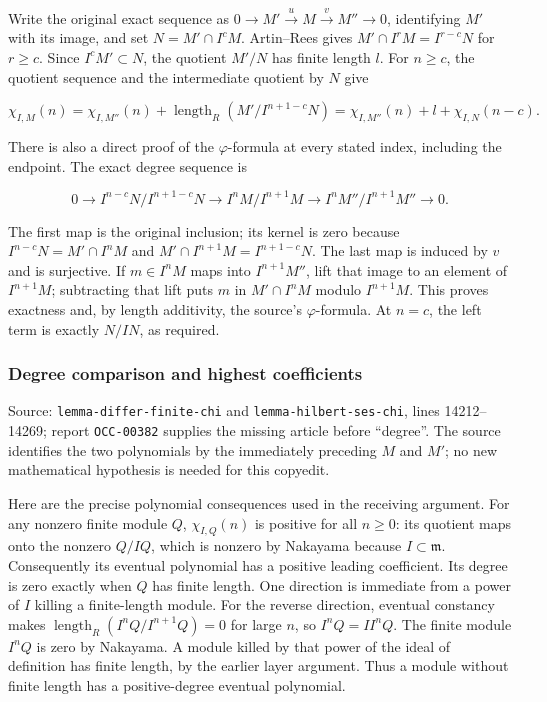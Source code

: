 Write the original exact sequence as \(0\to M'\xrightarrow{u}M\xrightarrow{v}M''\to0\), identifying \(M'\) with its image, and set \(N=M'\cap I^cM\). Artin--Rees gives \(M'\cap I^rM=I^{r-c}N\) for \(r\geq c\). Since \(I^cM'\subset N\), the quotient \(M'/N\) has finite length \(l\). For \(n\geq c\), the quotient sequence and the intermediate quotient by \(N\) give

\[
\chi_{I,M}(n)=\chi_{I,M''}(n)
 +\operatorname{length}_R(M'/I^{n+1-c}N)
=\chi_{I,M''}(n)+l+\chi_{I,N}(n-c).
\]

There is also a direct proof of the \(\varphi\)-formula at every stated index, including the endpoint. The exact degree sequence is

\[
0\longrightarrow I^{n-c}N/I^{n+1-c}N
\longrightarrow I^nM/I^{n+1}M
\longrightarrow I^nM''/I^{n+1}M''\longrightarrow0.
\]

The first map is the original inclusion; its kernel is zero because \(I^{n-c}N=M'\cap I^nM\) and \(M'\cap I^{n+1}M=I^{n+1-c}N\). The last map is induced by \(v\) and is surjective. If \(m\in I^nM\) maps into \(I^{n+1}M''\), lift that image to an element of \(I^{n+1}M\); subtracting that lift puts \(m\) in \(M'\cap I^nM\) modulo \(I^{n+1}M\). This proves exactness and, by length additivity, the source's \(\varphi\)-formula. At \(n=c\), the left term is exactly \(N/IN\), as required.

\subsubsection{Degree comparison and highest coefficients}\label{algebra-proof-003-degree-comparison-and-highest-coefficients}

Source: \texttt{lemma-\AlgebraIdentifierBreak{}differ-\AlgebraIdentifierBreak{}finite-\AlgebraIdentifierBreak{}chi} and \texttt{lemma-\AlgebraIdentifierBreak{}hilbert-\AlgebraIdentifierBreak{}ses-\AlgebraIdentifierBreak{}chi}, lines 14212--14269; report \texttt{OCC-00382} supplies the missing article before ``degree''. The source identifies the two polynomials by the immediately preceding \(M\) and \(M'\); no new mathematical hypothesis is needed for this copyedit.

Here are the precise polynomial consequences used in the receiving argument. For any nonzero finite module \(Q\), \(\chi_{I,Q}(n)\) is positive for all \(n\geq0\): its quotient maps onto the nonzero \(Q/IQ\), which is nonzero by Nakayama because \(I\subset\mathfrak m\). Consequently its eventual polynomial has a positive leading coefficient. Its degree is zero exactly when \(Q\) has finite length. One direction is immediate from a power of \(I\) killing a finite-length module. For the reverse direction, eventual constancy makes \(\operatorname{length}_R(I^nQ/I^{n+1}Q)=0\) for large \(n\), so \(I^nQ=I I^nQ\). The finite module \(I^nQ\) is zero by Nakayama. A module killed by that power of the ideal of definition has finite length, by the earlier layer argument. Thus a module without finite length has a positive-degree eventual polynomial.

